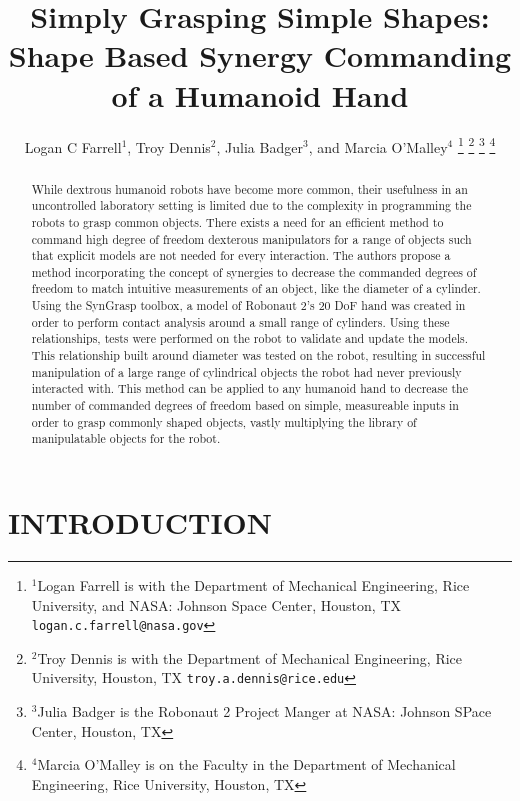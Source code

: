 \documentclass[letterpaper, 10 pt, conference]{ieeeconf}  %
\title{\LARGE \bf
Simply Grasping Simple Shapes:\\
Shape Based Synergy Commanding of a Humanoid Hand
}
\author{Logan C Farrell$^{1}$, Troy Dennis$^{2}$, Julia Badger$^{3}$, and Marcia O'Malley$^{4}$ %
\thanks{$^{1}$Logan Farrell is with the Department of Mechanical Engineering, Rice University, and NASA: Johnson Space Center, Houston, TX
        {\tt\small logan.c.farrell@nasa.gov}}%
\thanks{$^{2}$Troy Dennis is with the Department of Mechanical Engineering, Rice University, Houston, TX
        {\tt\small troy.a.dennis@rice.edu}}%
\thanks{$^{3}$Julia Badger is the Robonaut 2 Project Manger at NASA: Johnson SPace Center, Houston, TX}
\thanks{$^{4}$Marcia O'Malley is on the Faculty in the Department of Mechanical Engineering, Rice University, Houston, TX}
}
\begin{document}
\maketitle
\thispagestyle{empty}
\pagestyle{empty}


\begin{abstract}

While dextrous humanoid robots have become more common, their usefulness in an uncontrolled laboratory setting is limited due to the complexity in programming the robots to grasp common objects. There exists a need for an efficient method to command high degree of freedom dexterous manipulators for a range of objects such that explicit models are not needed for every interaction. The authors propose a method incorporating the concept of synergies to decrease the commanded degrees of freedom to match intuitive measurements of an object, like the diameter of a cylinder. Using the SynGrasp toolbox, a model of Robonaut 2's 20 DoF hand was created in order to perform contact analysis around a small range of cylinders. Using these relationships, tests were performed on the robot to validate and update the models. This relationship built around diameter was tested on the robot, resulting in successful manipulation of a large range of cylindrical objects the robot had never previously interacted with. This method can be applied to any humanoid hand to decrease the number of commanded degrees of freedom based on simple, measureable inputs in order to grasp commonly shaped objects, vastly multiplying the library of manipulatable objects for the robot. 

\end{abstract}



\section{INTRODUCTION}
\end{document}
